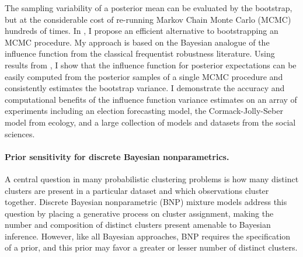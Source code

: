 The sampling variability of a posterior mean can be evaluated by the bootstrap,
but at the considerable cost of re-running Markov Chain Monte Carlo (MCMC)
hundreds of times. In \citet{giordano:2020:stanconbayesij,
giordano:2021:bayesij}, I propose an efficient alternative to bootstrapping an
MCMC procedure.  My approach is based on the Bayesian analogue of the influence
function from the classical frequentist robustness literature.  Using results
from \citet{giordano:2018:covariances, giordano:2019:ij}, I show that the
influence function for posterior expectations can be easily computed from the
posterior samples of a single MCMC procedure and consistently estimates the
bootstrap variance. I demonstrate the accuracy and computational benefits of the
influence function variance estimates on an array of experiments including an
election forecasting model, the Cormack-Jolly-Seber model from ecology, and a
large collection of models and datasets from the social sciences.



\paragraph{Prior sensitivity for discrete Bayesian nonparametrics.}
%
A central question in many probabilistic clustering problems is how many
distinct clusters are present in a particular dataset and which observations
cluster together. Discrete Bayesian nonparametric (BNP) mixture models address
this question by placing a generative process on cluster assignment, making the
number and composition of distinct clusters present amenable to Bayesian
inference.  However, like all Bayesian approaches, BNP requires the
specification of a prior, and this prior may favor a greater or lesser number of
distinct clusters.

